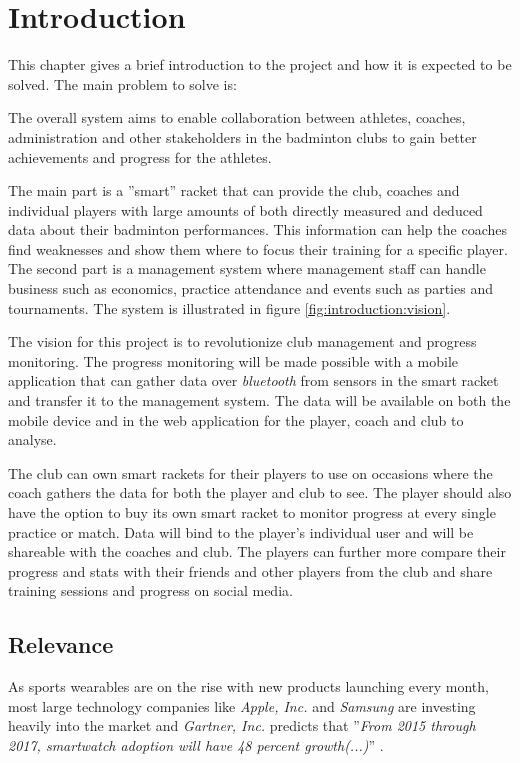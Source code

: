 \chapter{Introduction}
This chapter gives a brief introduction to the project and how it is expected to be solved.
The main problem to solve is:


The overall system aims to enable collaboration between athletes, coaches, administration and other stakeholders in the badminton clubs to gain better achievements and progress for the athletes.

The main part is a ''smart'' racket that can provide the club, coaches and individual players with large amounts of both directly measured and deduced data about their badminton performances.
This information can help the coaches find weaknesses and show them where to focus their training for a specific player.
The second part is a management system where management staff can handle business such as economics, practice attendance and events such as parties and tournaments.
The system is illustrated in figure \ref{fig:introduction:vision}.


The vision for this project is to revolutionize club management and progress monitoring.
The progress monitoring will be made possible with a mobile application that can gather data over \textit{\gls{bluetooth}} from sensors in the smart racket and transfer it to the management system.
The data will be available on both the mobile device and in the web application for the player, coach and club to analyse.

The club can own smart rackets for their players to use on occasions where the coach gathers the data for both the player and club to see.
The player should also have the option to buy its own smart racket to monitor progress at every single practice or match.
Data will bind to the player's individual user and will be shareable with the coaches and club.
The players can further more compare their progress and stats with their friends and other players from the club and share training sessions and progress on social media.

\section{Relevance}
As sports wearables are on the rise with new products launching every month, most large technology companies like \textit{Apple, Inc.} and \textit{Samsung} are investing heavily into the market and \textit{Gartner, Inc.} predicts that ''\textit{From 2015 through 2017, smartwatch adoption will have 48 percent growth(...)}'' \citep{introduction:relevance:gartner}.

